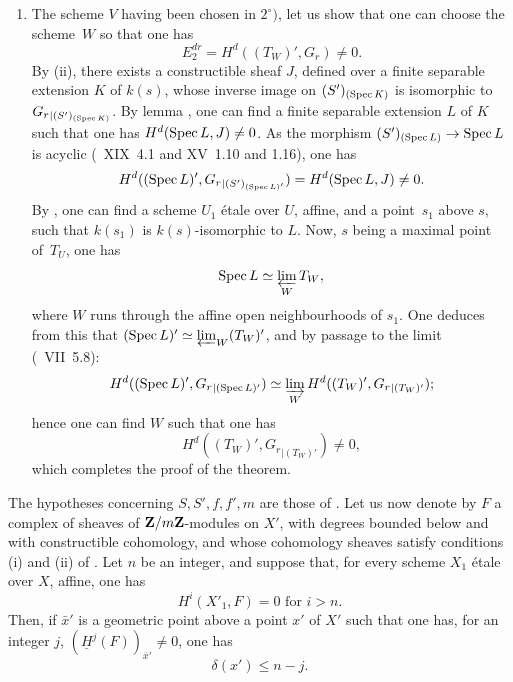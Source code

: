 \begin{enumerate}
\item[$3^\circ)$]
The scheme $V$ having been chosen in $2^\circ)$, let us show that one can choose the scheme~$W$ so that one has
$$
E^{dr}_2 = H^d((T_W)', G_r) \neq 0.
$$
By \textup{(ii)}, there exists a constructible sheaf $J$, defined over a finite separable extension $K$ of $k(s)$, whose inverse image on $(S')_{(\operatorname{Spec} K)}$ is isomorphic to ${G_r}_{|(S')_{(\operatorname{Spec} K)}}$. By lemma , one can find a finite separable extension $L$ of $K$ such that one has $H^d(\operatorname{Spec} L, J) \neq 0$. As the morphism $(S')_{(\Spec L)} \to \Spec L$ is acyclic (~XIX~4.1 and XV~1.10 and 1.16), one has
$$
H^d((\operatorname{Spec} L)', {G_r}_{|(S')_{(\operatorname{Spec} L)'}}) = H^d(\operatorname{Spec} L, J) \neq 0.
$$
By , one can find a scheme $U_1$ \'etale over $U$, affine, and a point~$s_1$ above $s$, such that $k(s_1)$ is $k(s)$-isomorphic to $L$. Now, $s$ being a maximal point of~$T_U$, one has
$$
\operatorname{Spec} L \simeq \varprojlim_W T_W,
$$
where $W$ runs through the affine open neighbourhoods of $s_1$. One deduces from this that $(\operatorname{Spec} L)' \simeq \varprojlim_W(T_W)'$, and by passage to the limit (~VII~5.8):
$$
H^d((\operatorname{Spec} L)', {G_r}_{|(\operatorname{Spec} L)'}) \simeq \varinjlim_W H^d((T_W)', {G_r}_{|(T_W)'});
$$
hence one can find $W$ such that one has
$$
H^d((T_W)', {G_r}_{|(T_W)'})\neq 0,
$$
which completes the proof of the theorem.
\end{enumerate}

\begin{corollary} \label{XIV.3.6}
The hypotheses concerning $S, S', f, f', m$ are those of . Let us now denote by $F$ a complex of sheaves of $\mathbf{Z}/m\mathbf{Z}$-modules on $X'$, with degrees bounded below and with constructible cohomology, and whose cohomology sheaves satisfy conditions \textup{(i)} and \textup{(ii)} of . Let $n$ be an integer, and suppose that, for every scheme $X_1$ \'etale over $X$, affine, one has
$$
H^i(X'_1, F)=0\text{ for } i>n.
$$
Then, if $\bar{x}'$ is a geometric point above a point $x'$ of $X'$ such that one has, for an integer $j$, $(\underline{H}^j(F))_{\bar{x}'} \neq 0$, one has
$$
\delta(x')\leq n-j.
$$
\end{corollary}


